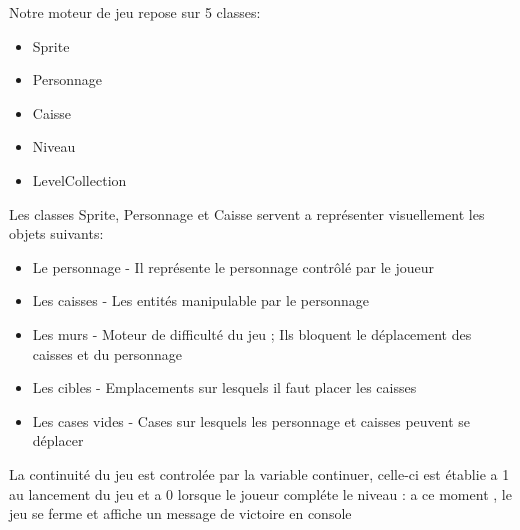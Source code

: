 \documentclass{article}
\begin{document}
			Notre moteur de jeu repose sur 5 classes:
			\begin{itemize}
				\item Sprite 
				\item Personnage 
				\item Caisse
				\item Niveau
				\item LevelCollection
				\end{itemize}
				\vspace{0.5cm}
			Les classes Sprite, Personnage et Caisse servent a représenter visuellement les objets suivants:
				\begin{itemize}
					\item Le personnage - Il représente le personnage contrôlé par le joueur
					\item Les caisses - Les entités manipulable par le personnage
					\item Les murs - Moteur de difficulté du jeu ; Ils bloquent le déplacement des caisses et du personnage
					\item Les cibles - Emplacements sur lesquels il faut placer les caisses
					\item Les cases vides - Cases sur lesquels les personnage et caisses peuvent se déplacer
				\end{itemize}
				\vspace{0.5cm}
				La continuité du jeu est controlée par la variable continuer, celle-ci est établie a 1 au lancement du jeu et a 0 lorsque le joueur compléte le niveau : a ce moment , le jeu se ferme et affiche un message de victoire en console
				
\end{document}
